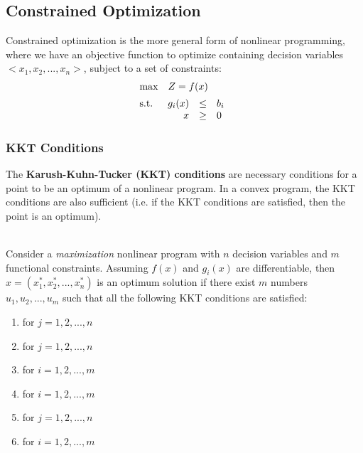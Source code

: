 \documentclass[12pt]{article}
\begin{document}
\subsection{Constrained Optimization}
Constrained optimization is the more general form of nonlinear programming, where we have an objective function to optimize containing decision variables $<x_1, x_2, ... , x_n>$, subject to a set of constraints:
\begin{align*}
    &\mathrm{max} \quad Z = f(x) \\[2pt]
    &\mathrm{s.t.} \quad 
    \begin{array}[t]{r c l}
        g_i(x) & \leq & b_i \\
        x & \geq & 0
    \end{array}
\end{align*}

\subsubsection{KKT Conditions}
The \textbf{Karush-Kuhn-Tucker (KKT) conditions} are necessary conditions for a point to be an optimum of a nonlinear program.
In a convex program, the KKT conditions are also sufficient (i.e. if the KKT conditions are satisfied, then the point is an optimum).

\noindent
\\
Consider a \textit{maximization} nonlinear program with $n$ decision variables and $m$ functional constraints.
Assuming $f(x)$ and $g_i(x)$ are differentiable, then $x = (x_1^*, x_2^*, ... , x_n^*)$ is an optimum solution if there exist $m$ numbers $u_1, u_2, ... , u_m$ such that all the following KKT conditions are satisfied:

\begin{enumerate}
    \item {} for $j = 1, 2, ... , n$
    \item {} for $j = 1, 2, ... , n$
    \item {} for $i = 1, 2, ... , m$
    \item {} for $i = 1, 2, ... , m$
    \item {} for $j = 1, 2, ... , n$
    \item {} for $i = 1, 2, ... , m$
\end{enumerate}
\end{document}
